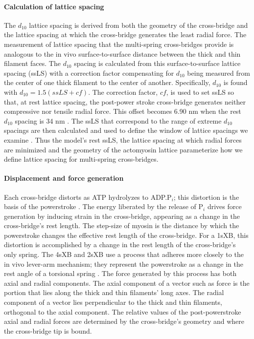 \documentclass[]{article}
\begin{document}
\paragraph{Calculation of lattice spacing} %
The $d_{10}$ lattice spacing is derived from both the geometry of the cross-bridge and the lattice spacing at which the cross-bridge generates the least radial force. 
The measurement of lattice spacing that the multi-spring cross-bridges provide is analogous to the in vivo surface-to-surface distance between the thick and thin filament faces.
The $d_{10}$ spacing is calculated from this surface-to-surface lattice spacing (ssLS) with a correction factor compensating for $d_{10}$ being measured from the center of one thick filament to the center of another. 
Specifically, $d_{10}$ is found with $d_{10} = 1.5 (ssLS + cf)$. 
The correction factor, $cf$, is used to set ssLS so that, at rest lattice spacing,  the post-power stroke cross-bridge generates neither compressive nor tensile radial force.  
This offset becomes 6.90 nm when the rest $d_{10}$ spacing is 34 nm \citep{Brenner1991}. 
The ssLS that correspond to the range of extreme $d_{10}$ spacings are then calculated and used to define the window of lattice spacings we examine \citep{Millman1998}. 
Thus the model's rest ssLS, the lattice spacing at which radial forces are minimized and the geometry of the actomyosin lattice parameterize how we define lattice spacing for multi-spring cross-bridges. 

\paragraph{Displacement and force generation} %
Each cross-bridge distorts as ATP hydrolyzes to ADP.P$_i$; this distortion is the basis of the powerstroke \citep{Pate1989, Daniel1998, Tanner2007}. 
The energy liberated by the release of P$_i$ drives force generation by inducing strain in the cross-bridge, appearing as a change in the cross-bridge's rest length.  
The step-size of myosin is the distance by which the powerstroke changes the effective rest length of the cross-bridge.  
For a 1sXB, this distortion is accomplished by a change in the rest length of the cross-bridge's only spring. 
The 4sXB and 2sXB use a process that adheres more closely to the in vivo lever-arm mechanism; they represent the powerstroke as a change in the rest angle of a torsional spring \citep{Reedy2000}.
The force generated by this process has both axial and radial components. 
The axial component of a vector such as force is the portion that lies along the thick and thin filaments' long axes. 
The radial component of a vector lies perpendicular to the thick and thin filaments, orthogonal to the axial component. 
The relative values of the post-powerstroke axial and radial forces are determined by the cross-bridge's geometry and where the cross-bridge tip is bound. 
\end{document}
